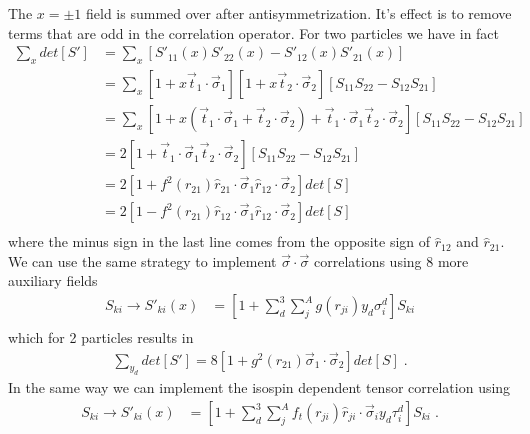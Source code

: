 \documentclass[a4paper]{article}
\begin{document}
The $x=\pm1$ field is summed over after antisymmetrization. It's effect is to remove terms that are odd in the correlation operator. For two  particles we have in fact
\begin{equation}
\begin{split}
\sum_x det\left[S'\right] &= \sum_x \left[ S'_{11}(x)S'_{22}(x) - S'_{12}(x)S'_{21}(x) \right]\\
&= \sum_x \left[ 1 + x \vec{t}_1\cdot\vec{\sigma}_1\right]\left[ 1 + x \vec{t}_2\cdot\vec{\sigma}_2\right]\left[ S_{11}S_{22} - S_{12}S_{21} \right]\\
&= \sum_x \left[ 1 + x \left( \vec{t}_1\cdot\vec{\sigma}_1+\vec{t}_2\cdot\vec{\sigma}_2\right) + \vec{t}_1\cdot\vec{\sigma}_1 \vec{t}_2\cdot\vec{\sigma}_2\right]\left[ S_{11}S_{22} - S_{12}S_{21} \right]\\
&= 2\left[ 1 + \vec{t}_1\cdot\vec{\sigma}_1 \vec{t}_2\cdot\vec{\sigma}_2\right]\left[ S_{11}S_{22} - S_{12}S_{21} \right]\\
&= 2\left[ 1 + f^2(r_{21})\hat{r}_{21}\cdot\vec{\sigma}_1 \hat{r}_{12}\cdot\vec{\sigma}_2\right]det\left[S\right]\\
&= 2\left[ 1 - f^2(r_{21})\hat{r}_{12}\cdot\vec{\sigma}_1 \hat{r}_{12}\cdot\vec{\sigma}_2\right]det\left[S\right]\\
\end{split}
\end{equation}
where the minus sign in the last line comes from the opposite sign of $\hat{r}_{12}$ and $\hat{r}_{21}$.
We can use the same strategy to implement $\vec{\sigma}\cdot\vec{\sigma}$ correlations using 8 more auxiliary fields
\begin{equation}
\begin{split}
S_{ki} \to S'_{ki}(x) &= \left[ 1 + \sum_d^3 \sum_j^A g(r_{ji}) y_d\sigma^d_i\right]S_{ki}\\
\end{split}
\end{equation}
which for 2 particles results in
\begin{equation}
\begin{split}
\sum_{y_d} det\left[S'\right] = 8\left[ 1 + g^2(r_{21})\vec{\sigma}_1\cdot\vec{\sigma}_2\right]det\left[S\right]\;.
\end{split}
\end{equation}
In the same way we can implement the isospin dependent tensor correlation using
\begin{equation}
\begin{split}
S_{ki} \to S'_{ki}(x) &= \left[ 1 + \sum_d^3 \sum_j^A f_t(r_{ji}) \hat{r}_{ji}\cdot\vec{\sigma}_i y_d\tau^d_i\right]S_{ki}\;.
\end{split}
\end{equation}
\end{document}
